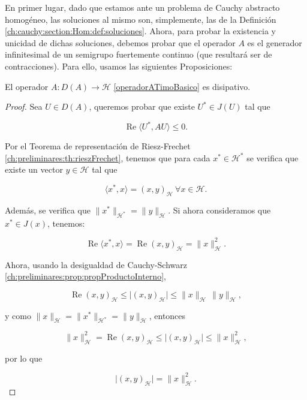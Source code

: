En primer lugar, dado que estamos ante un problema de Cauchy abstracto homogéneo, las soluciones al mismo son, simplemente, las de la Definición \ref{ch:cauchy:section:Hom:def:soluciones}. Ahora, para probar la existencia y unicidad de dichas soluciones, debemos probar que el operador $A$ es el generador infinitesimal de un semigrupo fuertemente continuo (que resultará ser de contracciones). Para ello, usamos las siguientes Proposiciones:

\begin{Proposicion}
\label{ch:teoriaVigas:prop:AesDisipativo}

    El operador $A : D(A) \rightarrow \mathcal{H}$ \eqref{operadorATimoBasico} es disipativo.
\end{Proposicion}

\begin{proof}
    Sea $U \in D(A)$, queremos probar que existe $U^* \in J(U)$ tal que

    \[\operatorname{Re}\langle U^*, AU\rangle \leq 0.\]

    Por el Teorema de representación de Riesz-Frechet \ref{ch:preliminares:th:rieszFrechet}, tenemos que para cada $x^* \in \mathcal{H}^*$ se verifica que existe un vector $y \in \mathcal{H}$ tal que

    \[\langle x^*, x \rangle = (x, y)_{\mathcal{H}} \ \forall x \in \mathcal{H}.\]

    Además, se verifica que $\lVert x^* \rVert_{\mathcal{H}^*} = \lVert y \rVert_{\mathcal{H}}$. Si ahora consideramos que $x^* \in J(x)$, tenemos:

    \[\operatorname{Re} \langle x^*, x \rangle = \operatorname{Re} (x,y)_{\mathcal{H}} = \lVert x \rVert^2_{\mathcal{H}}.\]

    Ahora, usando la desigualdad de Cauchy-Schwarz \ref{ch:preliminares:prop:propProductoInterno},

    \[\operatorname{Re}(x,y)_{\mathcal{H}} \leq \lvert (x,y)_{\mathcal{H}} \lvert \leq \lVert x \rVert_{\mathcal{H}} \, \lVert y \rVert_{\mathcal{H}},\]

    y como $\lVert x \rVert_{\mathcal{H}} = \lVert x^* \rVert_{\mathcal{H^*}} = \lVert y \rVert_{\mathcal{H}}$, entonces

    \[\lVert x \rVert^2_{\mathcal{H}} = \operatorname{Re}(x,y)_{\mathcal{H}} \leq \lvert (x,y)_{\mathcal{H}} \lvert \leq \lVert x \rVert^2_{\mathcal{H}},\]

    por lo que

    \[\lvert (x,y)_{\mathcal{H}}\lvert = \lVert x \rVert^2_{\mathcal{H}}.\]


\end{proof}
